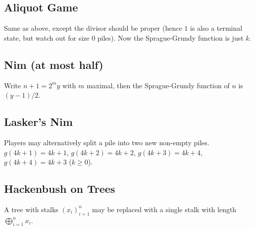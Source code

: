 {    \subsection{Aliquot Game}
    Same as above, except the divisor should be proper (hence $1$ is also a terminal state, but watch out for size $0$ piles). Now the Sprague-Grundy function is just $k$.\newline
    \subsection{Nim (at most half)}
    Write $n+1 = 2^my$ with $m$ maximal, then the Sprague-Grundy function of $n$ is $(y - 1) / 2$.\newline
    \subsection{Lasker's Nim}
    Players may alternatively split a pile into two new non-empty piles. $g(4k+1) = 4k+1$, $g(4k+2) = 4k+2$, $g(4k+3) = 4k+4$, $g(4k+4) = 4k+3$ ($k\geq 0$).\newline
    \subsection{Hackenbush on Trees}
    A tree with stalks $(x_i)_{i=1}^n$ may be replaced with a single stalk with length $\bigoplus_{i=1}^n x_i$.\newline

	}
